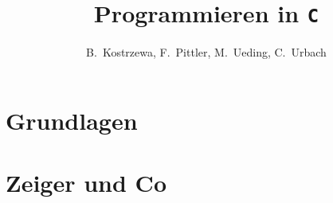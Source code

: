 \documentclass[12pt]{scrbook}
\title{Programmieren in \texttt{C}}
\author{B.~Kostrzewa, F.~Pittler, M.~Ueding, C.~Urbach}
\begin{document}
\maketitle

\tableofcontents

\clearpage
\chapter{Grundlagen}







\chapter{Zeiger und Co}






%
%

\printindex
\end{document}
